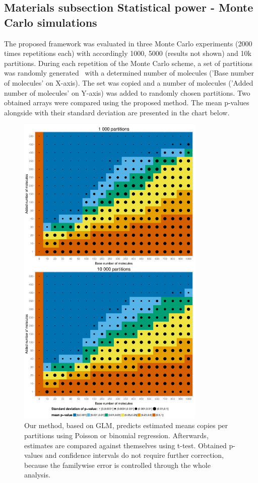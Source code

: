 \documentclass[a4,center,fleqn]{NAR}
\begin{document}
\subsection{Materials subsection Statistical power - Monte Carlo simulations}

The proposed framework was evaluated in three Monte Carlo experiments (2000 times repetitions each) with accordingly 1000, 5000 (results not shown) and 10k partitions. During each repetition of the Monte Carlo scheme, a set of partitions was randomly generated~\cite{dube_mathematical_2008} with a determined number of molecules ('Base number of molecules' on X-axis). The set was copied and a number of molecules ('Added number of molecules' on Y-axis) was added to randomly chosen partitions. Two obtained arrays were compared using the proposed method. The mean p-values alongside with their standard deviation are presented in the chart below.

\begin{figure}[t]
\begin{center}
\includegraphics[width=9cm]{mc_figures-1.pdf}
\end{center}
\caption{Our method, based on GLM, predicts estimated means copies per partitions using Poisson or binomial regression. Afterwards, estimates are compared against themselves using t-test. Obtained p-values and confidence intervals do not require further correction, because the familywise error is controlled through the whole analysis.}
\label{mc_figures-1}
\end{figure}
\end{document}
